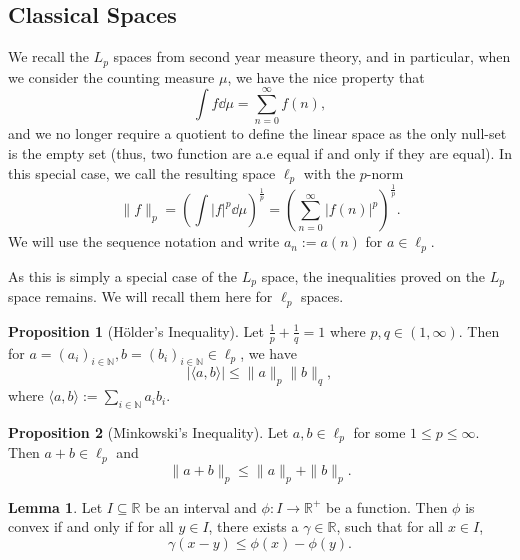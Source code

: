 \documentclass[]{article}
\theoremstyle{definition}
\theoremstyle{definition}
\newtheorem{lemma}{Lemma}[section]
\newtheorem{proposition}{Proposition}[section]
\begin{document}
\subsection{Classical Spaces}

We recall the \(L_p\) spaces from second year measure theory, and in particular, 
when we consider the counting measure \(\mu\), we have the nice property that 
\[\int f \dd \mu = \sum_{n = 0}^\infty f(n),\]
and we no longer require a quotient to define the linear space as the only 
null-set is the empty set (thus, two function are a.e equal if and only if they 
are equal). In this special case, we call the resulting space \(\ell_p\) with 
the \(p\)-norm 
\[\|f\|_p = \left(\int |f|^p \dd \mu\right)^{\frac{1}{p}} = 
  \left(\sum_{n = 0}^\infty |f(n)|^p \right)^{\frac{1}{p}}.\]
We will use the sequence notation and write \(a_n := a(n)\) for \(a \in \ell_p\).

As this is simply a special case of the \(L_p\) space, the inequalities proved 
on the \(L_p\) space remains. We will recall them here for \(\ell_p\) spaces.

\begin{proposition}[Hölder's Inequality]
  Let \(\frac{1}{p} + \frac{1}{q} = 1\) where \(p, q \in (1, \infty)\). Then 
  for \(a = (a_i)_{i \in \mathbb{N}}, b = (b_i)_{i \in \mathbb{N}} \in \ell_p\), 
  we have 
  \[|\langle a, b\rangle| \le \|a\|_p \|b\|_q,\] 
  where \(\langle a, b\rangle := \sum_{i \in \mathbb{N}} a_i b_i\).
\end{proposition}

\begin{proposition}[Minkowski's Inequality]
  Let \(a, b \in \ell_p\) for some \(1 \le p \le \infty\). 
  Then \(a + b \in \ell_p\) and
  \[\|a + b\|_p \le \|a\|_p + \|b\|_p.\]
\end{proposition}

\begin{lemma}
  Let \(I \subseteq \mathbb{R}\) be an interval and 
  \(\phi : I \to \mathbb{R}^+\) be a function. 
  Then \(\phi\) is convex if and only if for all \(y \in I\), there exists 
  a \(\gamma \in \mathbb{R}\), such that for all \(x \in I\),
  \[\gamma(x - y) \le \phi(x) - \phi(y).\]
\end{lemma}
\end{document}
